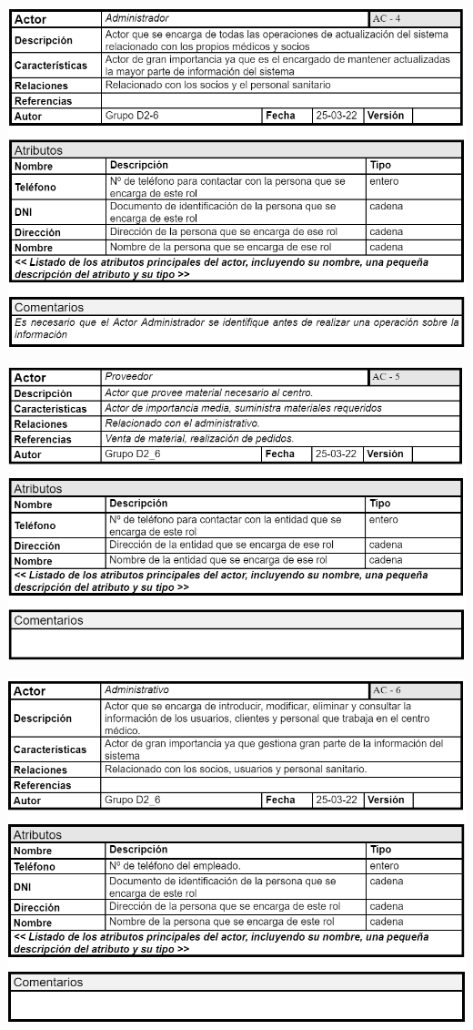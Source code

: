 \documentclass[12pt, spanish]{article}
\begin{document}
\begin{centering}\includegraphics[scale = 0.65]{Actores/Actor4.png}\\[1.0 cm]\end{centering}
\begin{centering}\includegraphics[scale = 0.65]{Actores/Actor5.png}\\[1.0 cm]\end{centering}
\begin{centering}\includegraphics[scale = 0.65]{Actores/Actor6.png}\\[1.0 cm]\end{centering}
\end{document}
